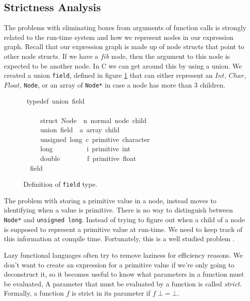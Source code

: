 \documentclass{book}
\theoremstyle{definition}
\newcommand{\Conid}[1]{\mathit{#1}}
\newcommand{\Varid}[1]{\mathit{#1}}
\begin{document}
\subsection{Strictness Analysis}

The problems with eliminating boxes from arguments of function calls
is strongly related to the run-time system and how we represent nodes
in our expression graph.
Recall that our expression graph is made up of node structs
that point to other node structs.
If we have a \ensuremath{\Varid{fib}} node, then the argument to this node
is expected to be another node.
In C we can get around this by using a union.
We created a union \texttt{field}, defined in figure \ref{fig:field}
that can either represent an \ensuremath{\Conid{Int}}, \ensuremath{\Conid{Char}}, \ensuremath{\Conid{Float}}, \texttt{Node}, or an array of \texttt{Node*}
in case a node has more than 3 children.

\begin{figure}

\begin{tabbing}\ttfamily
~typedef~union~field\\
\ttfamily ~\\
\ttfamily ~~~~~struct~Node~~n~normal~node~child\\
\ttfamily ~~~~~union~field~~a~array~child\\
\ttfamily ~~~~~unsigned~long~c~primitive~character\\
\ttfamily ~~~~~long~~~~~~~~~~i~primitive~int\\
\ttfamily ~~~~~double~~~~~~~~f~primitive~float\\
\ttfamily ~~field
\end{tabbing}
\caption{Definition of \texttt{field} type.}
\label{fig:field}
\end{figure}

The problem with storing a primitive value in a node,
instead moves to identifying when a value is primitive.
There is no way to distinguish between 
\texttt{Node*} and \texttt{unsigned long}.
Instead of trying to figure out when a child of a node is supposed 
to represent a primitive value at run-time.  
We need to keep track of this information at compile time.
Fortunately, this is a well studied problem 
\cite{strictProj, strictAbstract, strictBack}.

Lazy functional languages often try to remove laziness for efficiency reasons.
We don't want to create an expression for a primitive value 
if we're only going to deconstruct it,
so it becomes useful to know what parameters in a function must be evaluated,
A parameter that must be evaluated by a function is called \emph{strict}.
Formally, a function \ensuremath{\Varid{f}} is strict in its parameter if 
\ensuremath{\Varid{f}\;\bot \mathrel{=}\bot }.
\end{document}
